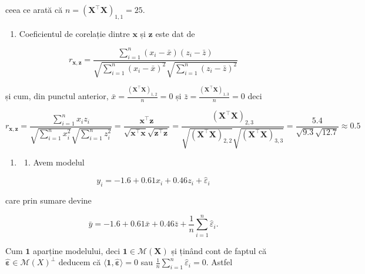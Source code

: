 \documentclass[]{article}
\providecommand{\tightlist}{%
  \setlength{\itemsep}{0pt}\setlength{\parskip}{0pt}}
\begin{document}
ceea ce arată că
\(n = \left(\boldsymbol X^\intercal\boldsymbol X\right)_{1,1} = 25\).

\begin{enumerate}
\def\labelenumi{\alph{enumi})}
\setcounter{enumi}{2}
\tightlist
\item
  Coeficientul de corelație dintre \(\boldsymbol x\) și
  \(\boldsymbol z\) este dat de
\end{enumerate}

\[
  r_{\boldsymbol x,\boldsymbol z} = \frac{\sum_{i=1}^{n}(x_i - \bar x)(z_i - \bar z)}{\sqrt{\sum_{i = 1}^{n}(x_i - \bar x)^2}\sqrt{\sum_{i = 1}^{n}(z_i - \bar z)^2}}
\]

și cum, din punctul anterior,
\(\bar x = \frac{\left(\boldsymbol X^\intercal\boldsymbol X\right)_{1,2}}{n} = 0\)
și
\(\bar z = \frac{\left(\boldsymbol X^\intercal\boldsymbol X\right)_{1,3}}{n} = 0\)
deci

\[
  r_{\boldsymbol x,\boldsymbol z} = \frac{\sum_{i=1}^{n}x_iz_i}{\sqrt{\sum_{i = 1}^{n}x_i^2}\sqrt{\sum_{i = 1}^{n}z_i^2}} = \frac{\boldsymbol x^\intercal\boldsymbol z}{\sqrt{\boldsymbol x^\intercal\boldsymbol x}\sqrt{\boldsymbol z^\intercal\boldsymbol z}} = \frac{\left(\boldsymbol X^\intercal\boldsymbol X\right)_{2,3}}{\sqrt{\left(\boldsymbol X^\intercal\boldsymbol X\right)_{2,2}}\sqrt{\left(\boldsymbol X^\intercal\boldsymbol X\right)_{3,3}}} = \frac{5.4}{\sqrt{9.3}\sqrt{12.7}}\approx 0.5
\]

\begin{enumerate}
\def\labelenumi{\arabic{enumi}.}
\setcounter{enumi}{1}
\item
  \begin{enumerate}
  \def\labelenumii{\alph{enumii})}
  \tightlist
  \item
    Avem modelul
  \end{enumerate}
\end{enumerate}

\[
  y_i = -1.6 + 0.61 x_i + 0.46 z_i + \hat{\varepsilon}_i
\]

care prin sumare devine

\[
  \bar y = -1.6 + 0.61 \bar x + 0.46 \bar z + \frac{1}{n}\sum_{i=1}^{n}\hat{\varepsilon}_i.
\]

Cum \(\mathbf{1}\) aparține modelului, deci
\(\mathbf{1}\in\mathcal{M}(\boldsymbol X)\) și ținând cont de faptul că
\(\hat{\boldsymbol \varepsilon}\in\mathcal{M}(X)^\perp\) deducem că
\(\langle\mathbf{1}, \hat{\boldsymbol \varepsilon}\rangle = 0\) sau
\(\frac{1}{n}\sum_{i=1}^{n}\hat{\varepsilon}_i = 0\). Astfel
\end{document}
